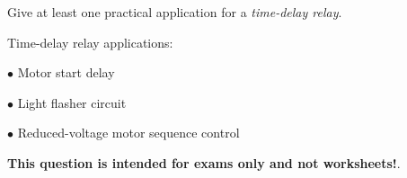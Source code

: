 

Give at least one practical application for a {\it time-delay relay}.







Time-delay relay applications:

\medskip
\goodbreak
\item{$\bullet$} Motor start delay
\item{$\bullet$} Light flasher circuit
\item{$\bullet$} Reduced-voltage motor sequence control
\medskip







{\bf This question is intended for exams only and not worksheets!}.




